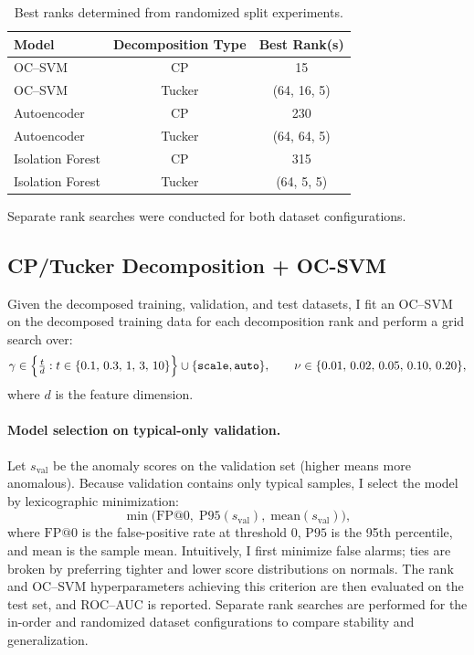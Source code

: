 \documentclass[11pt]{article}
\begin{document}
\begin{table}[H]
\centering
\caption{Best ranks determined from randomized split experiments.}
\label{tab:best-ranks-random}
\begin{tabular}{lcc}
\hline
\textbf{Model} & \textbf{Decomposition Type} & \textbf{Best Rank(s)} \\
\hline
OC--SVM         & CP     & 15 \\
OC--SVM         & Tucker & (64, 16, 5) \\
Autoencoder     & CP     & 230 \\
Autoencoder     & Tucker & (64, 64, 5) \\
Isolation Forest & CP     & 315 \\
Isolation Forest & Tucker & (64, 5, 5) \\
\hline
\end{tabular}
\end{table}

Separate rank searches were conducted for both dataset configurations.


\subsection{CP/Tucker Decomposition + OC-SVM}
Given the decomposed training, validation, and test datasets, I fit an OC\mbox{--}SVM on the decomposed training data for each decomposition rank and perform a grid search over:
\[
\gamma \in \Bigl\{ \tfrac{t}{d} : t \in \{0.1,\,0.3,\,1,\,3,\,10\} \Bigr\} \cup \{\texttt{scale}, \texttt{auto}\},
\qquad
\nu \in \{0.01,\,0.02,\,0.05,\,0.10,\,0.20\},
\]
where \(d\) is the feature dimension.

\paragraph{Model selection on typical-only validation.}
Let \(s_{\text{val}}\) be the anomaly scores on the validation set (higher means more anomalous). Because validation contains only typical samples, I select the model by lexicographic minimization:
\[
\min \bigl(\mathrm{FP}@0,\; \mathrm{P95}(s_{\text{val}}),\; \mathrm{mean}(s_{\text{val}})\bigr),
\]
where \(\mathrm{FP}@0\) is the false-positive rate at threshold \(0\), \(\mathrm{P95}\) is the 95th percentile, and \(\mathrm{mean}\) is the sample mean. Intuitively, I first minimize false alarms; ties are broken by preferring tighter and lower score distributions on normals. The rank and OC\mbox{--}SVM hyperparameters achieving this criterion are then evaluated on the test set, and ROC--AUC is reported. Separate rank searches are performed for the in-order and randomized dataset configurations to compare stability and generalization.
\end{document}

